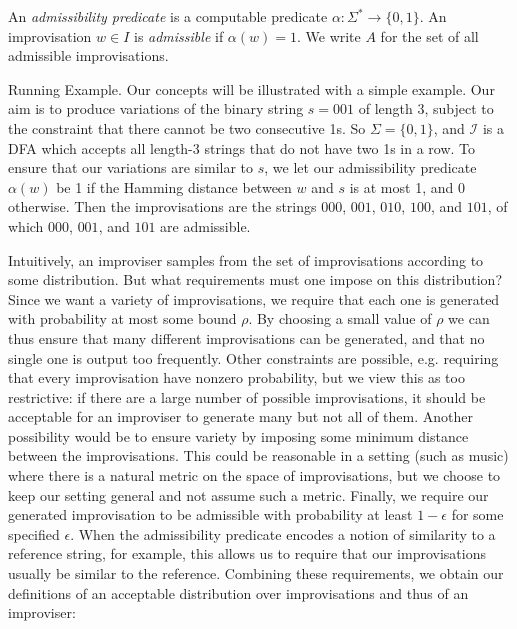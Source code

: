 \documentclass[a4paper,USenglish,numberwithinsect]{lipics}
\theoremstyle{plain}
\theoremstyle{definition}
\newcommand{\improvs}{I}
\newcommand{\valids}{A}
\newcommand{\creative}{admissible}
\begin{document}
\begin{definition}
An \emph{admissibility predicate} is a computable predicate $\alpha :
\Sigma^* \rightarrow \{0,1\}$. An improvisation $w \in \improvs$ is
\emph{\creative} if $\alpha(w) = 1$. We write $\valids$ for the set of
all {\creative} improvisations. 
\label{defn:admiss}
\end{definition}

\begin{subparagraph}{Running Example.}
Our concepts will be illustrated with a simple 
example. Our aim is to produce variations of the binary string $s =
001$ of length 3, subject to the constraint that there cannot be two
consecutive 1s. So $\Sigma = \{0,1\}$, and 
$\mathcal{\improvs}$ is a DFA which accepts all length-3 strings 
that do not have two 1s in a row. To ensure that our
variations are similar to $s$, we let our admissibility predicate
$\alpha(w)$ be 1 if the Hamming distance between $w$ and $s$ is at
most 1, and 0 otherwise. Then the improvisations are the strings
$000$, $001$, $010$, $100$, and $101$, of which $000$, $001$, and
$101$ are admissible. \\
\end{subparagraph}

Intuitively, an improviser samples from the set of improvisations according to some
distribution. But what requirements must one impose on this distribution?  Since we want a variety
of improvisations, we require that each one is generated with probability at most some bound
$\rho$. By choosing a small value of $\rho$ we can thus ensure that many different improvisations
can be generated, and that no single one is output too frequently. Other constraints are possible,
e.g. requiring that every improvisation have nonzero probability, but we view this as too
restrictive: if there are a large number of possible improvisations, it should be acceptable for an
improviser to generate many but not all of them.
Another possibility would be to ensure variety by imposing some minimum distance between the improvisations.
This could be reasonable in a setting (such as music) where there is a natural metric on the space of improvisations, but we choose to keep our setting general and not assume such a metric.
Finally, we require our generated improvisation to
be admissible with probability at least $1-\epsilon$ for some specified $\epsilon$. When the
admissibility predicate encodes a notion of similarity to a reference string, for example, this allows us to
require that our improvisations usually be similar to the reference. Combining these requirements,
we obtain our definitions of an acceptable distribution over improvisations and thus of an
improviser:
\end{document}
